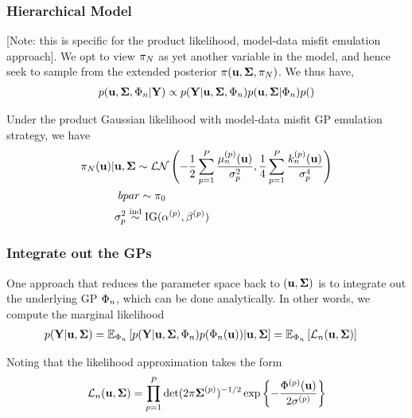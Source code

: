 \documentclass[12pt]{article}
\begin{document}
\subsubsection{Hierarchical Model}
[Note: this is specific for the product likelihood, model-data misfit emulation approach]. We opt to view $\pi_{N}$ as yet another variable in the model, and hence seek to 
sample from the extended posterior $\pi(\mathbf{u}, \boldsymbol{\Sigma}, \pi_{N})$. We thus have, 
\begin{align*}
p(\mathbf{u}, \boldsymbol{\Sigma}, {\Phi}_{n} | \mathbf{Y}) \propto p(\mathbf{Y} | \mathbf{u}, \boldsymbol{\Sigma}, {\Phi}_{n}) p(\mathbf{u}, \boldsymbol{\Sigma} | {\Phi}_{n})p()
\end{align*}


Under the product Gaussian likelihood with model-data misfit GP emulation strategy, we have 
\begin{align*}
\postDens_{\Ndesign}(\bpar) | &\bpar, \CovObs \sim \mathcal{LN}\left(-\frac{1}{2}\sum_{p=1}^{P} \frac{\GPMeanPredOut{\designIdx}{\objIdx}(\bpar)}{\sdObs_{\objIdx}^2}, 
													   \frac{1}{4} \sum_{\objIdx = 1}^{\Nobj} \frac{\GPKerPredOut{\designIdx}{\objIdx}(\bpar)}{\sdObs_{\objIdx}^4}\right) \\
&\	bpar \sim \priorDens \\
&\sdObs^2_{\objIdx} \overset{\text{ind}}{\sim} \text{IG}(\indexObj{\IGShape}, \indexObj{\IGScale}) 													   
\end{align*}

\subsubsection{Integrate out the GPs}
One approach that reduces the parameter space back to $(\mathbf{u}, \boldsymbol{\Sigma})$ is to integrate out the underlying GP ${\Phi}_{n}$, which can be done analytically. In other words, 
we compute the marginal likelihood 
\begin{align*}
p(\mathbf{Y} | \mathbf{u}, \boldsymbol{\Sigma}) &= \mathbb{E}_{{\Phi}_{n}}\left[ p(\mathbf{Y} | \mathbf{u}, \boldsymbol{\Sigma}, {\Phi}_{n})p({\Phi}_{n}(\mathbf{u})) | \mathbf{u}, \boldsymbol{\Sigma} \right] 
= \mathbb{E}_{{\Phi}_{n}}\left[\mathcal{L}_{n}(\mathbf{u}, \boldsymbol{\Sigma}) \right]
\end{align*}

Noting that the likelihood approximation takes the form 
\[
\mathcal{L}_{n}(\mathbf{u}, \boldsymbol{\Sigma}) = \prod_{p=1}^{P} \det(2\pi {\boldsymbol{\Sigma}}^{(p)})^{-1/2} \exp\left\{-\frac{{\Phi}^{(p)}(\mathbf{u})}{2{\sigma}^{(p)}} \right\} 
\]
\end{document}

